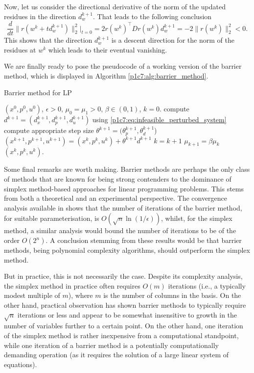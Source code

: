 Now, let us consider the directional derivative of the norm of the updated residues in the direction $d_w^{k+1}$. That leads to the following conclusion
	\begin{equation*}
		\frac{d}{dt} \big\| r(w^k + td_w^{k+1}) \big\|_2^2 \Big|_{t = 0} = 2r(w^k)^\top Dr(w^k)d_w^{k+1} = -2 \| r(w^k) \|_2^2 < 0.
	\end{equation*}
	This shows that the direction $d_w^{k+1}$ is a descent direction for the norm of the residues at $w^k$ which leads to their eventual vanishing.	
	
We are finally ready to pose the pseudocode of a working version of the barrier method, which is displayed in Algorithm \ref{p1c7:alg:barrier_method}.
	\captionsetup[algorithm]{font=footnotesize}
	\begin{algorithm}[H]
	\caption{Barrier method for LP} \label{p1c7:alg:barrier_method}
	\begin{algorithmic}[1] 
	  $(x^0, p^0, u^0)$, $\epsilon > 0$, $\mu_0 = \mu_1>0$, $\beta \in (0,1)$, $k = 0$. 
	    \State compute $d^{k+1} = (d_x^{k+1}, d_p^{k+1}, d_u^{k+1})$ using \eqref{p1c7:eq:infeasible_perturbed_system} 
	    \State compute appropriate step size $\theta^{k+1} = (\theta_p^{k+1}, \theta_d^{k+1}$)
	    \State $(x^{k+1}, p^{k+1}, u^{k+1}) = (x^k, p^k, u^k) + \theta^{k+1}d^{k+1}$
	    \State $k = k+1$
	    \State $\mu_{k+1} = \beta\mu_k$
	\EndWhile
	 $(x^k, p^k, u^k)$.
	\end{algorithmic} 
	\end{algorithm}
	
Some final remarks are worth making. Barrier methods are perhaps the only class of methods that are known for being strong contenders to the dominance of simplex method-based approaches for linear programming problems. This stems from both a theoretical and an experimental perspective. The convergence analysis available in \cite{gondzio2012interior} shows that the number of iterations of the barrier method, for suitable parameterisation, is $O(\sqrt{n}\ln(1/\epsilon))$, whilst, for the simplex method, a similar analysis would bound the number of iterations to be of the order $O(2^n)$. A conclusion stemming from these results would be that barrier methods, being polynomial complexity algorithms, should outperform the simplex method.

But in practice, this is not necessarily the case. Despite its complexity analysis, the simplex method in practice often requires $O(m)$ iterations (i.e., a typically modest multiple of $m$), where $m$ is the number of columns in the basis. On the other hand, practical observation has shown barrier methods to typically require $\sqrt{n}$ iterations or less and appear to be somewhat insensitive to growth in the number of variables further to a certain point. On the other hand, one iteration of the simplex method is rather inexpensive from a computational standpoint, while one iteration of a barrier method is a potentially computationally demanding operation (as it requires the solution of a large linear system of equations).

